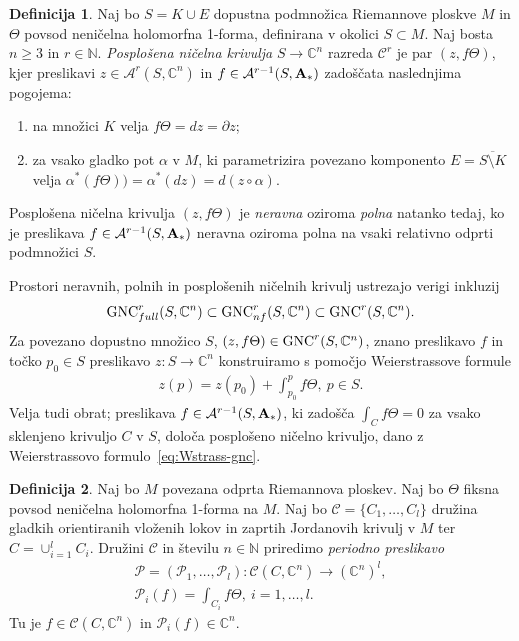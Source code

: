 \documentclass[12pt,a4paper,twoside]{article}
\theoremstyle{definition} %
\newtheorem{definicija}{Definicija}[section]
\theoremstyle{plain} %
\numberwithin{equation}{section}  %
\newcommand{\N}{\mathbb N}
\newcommand{\C}{\mathbb C}
\begin{document}
\begin{definicija}
Naj bo $S = K \cup E$ dopustna podmnožica Riemannove ploskve $M$ in $\Theta$ povsod neničelna holomorfna 1-forma, definirana v okolici $S \subset M$.
Naj bosta $n \geq 3$ in $r \in \N$. \emph{Posplošena ničelna krivulja} $S \to \C^{n}$ razreda $\mathcal{C}^{r}$ je par $(z, f \Theta)$, kjer preslikavi $z \in \mathcal{A}^{r}(S, \C^{n})$ in $f \in \mathcal{A}^{r-1}(S, \textbf{\textup{A}}_{*})$ zadoščata naslednjima pogojema:
\begin{enumerate}
\item na množici $K$ velja $f \Theta = dz = \partial z$;
\item za vsako gladko pot $\alpha$ v $M$, ki parametrizira povezano komponento $E = \overline{S \setminus K}$ velja $ \alpha^{*}(f \Theta)) = \alpha^{*}(dz) = d(z \circ \alpha)$.
\end{enumerate}
%
Posplošena ničelna krivulja $(z, f \Theta)$ je \emph{neravna} oziroma \emph{polna} natanko tedaj, ko je preslikava $f \in \mathcal{A}^{r-1}(S, \textbf{\textup{A}}_{*})$ neravna oziroma polna na vsaki relativno odprti podmnožici $S$.
\end{definicija}

Prostori neravnih, polnih in posplošenih ničelnih krivulj ustrezajo verigi inkluzij
\[ \textup{GNC}_{full}^{r}(S, \C^{n}) \subset \textup{GNC}_{nf}^{r}(S, \C^{n}) \subset \textup{GNC}^{r}(S, \C^{n}). \]
Za povezano dopustno množico $S$, $(z, f \Theta) \in \textup{GNC}^{r}(S, \C^{n})$, znano preslikavo $f$ in točko $p_{0} \in S$ preslikavo $z \colon S \to \C^{n}$ konstruiramo s pomočjo Weierstrassove formule
\begin{align} \label{eq:Wstrass-gnc}
z(p) = z(p_{0}) + \int_{p_0}^{p} f \Theta, \ p \in S.
\end{align} 
Velja tudi obrat; preslikava $f \in \mathcal{A}^{r-1}(S, \textbf{\textup{A}}_{*})$, ki zadošča $\int_{C} f \Theta = 0$ za vsako sklenjeno krivuljo $C$ v $S$, določa posplošeno ničelno krivuljo, dano z Weierstrassovo formulo~\ref{eq:Wstrass-gnc}.

\begin{definicija}
Naj bo $M$ povezana odprta Riemannova ploskev. Naj bo $\Theta$ fiksna povsod neničelna holomorfna 1-forma na $M$. Naj bo $\mathcal{C} = \{C_1, \dots , C_{l} \}$ družina gladkih orientiranih vloženih lokov in zaprtih Jordanovih krivulj v $M$ ter $C = \cup_{i=1}^{l} C_{i}$.
Družini $\mathcal{C}$ in številu $n \in \N$ priredimo \emph{periodno preslikavo}
\begin{align}
\mathcal{P} = (\mathcal{P}_1, \dots , \mathcal{P}_{l}) \colon \mathcal{C}(C, \C^{n}) \to (\C^{n})^{l}, \nonumber \\
\mathcal{P}_{i}(f) = \int_{C_{i}} f \Theta, \ i=1, \dots , l.
\end{align}
Tu je $f \in \mathcal{C}(C, \C^{n})$ in $\mathcal{P}_{i}(f) \in \C^{n}$.
\end{definicija}
\end{document}

